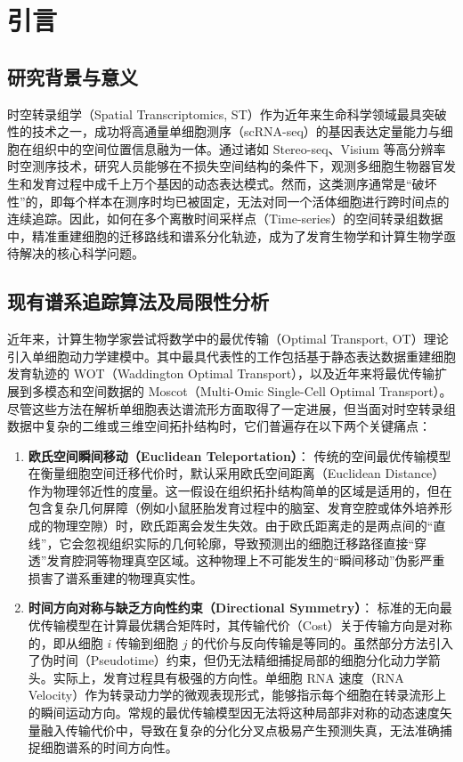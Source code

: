 
\chapter{引言}
\label{ch:intro}

\section{研究背景与意义}
时空转录组学（Spatial Transcriptomics, ST）作为近年来生命科学领域最具突破性的技术之一，成功将高通量单细胞测序（scRNA-seq）的基因表达定量能力与细胞在组织中的空间位置信息融为一体\cite{Asp2020}。通过诸如 Stereo-seq、Visium 等高分辨率时空测序技术，研究人员能够在不损失空间结构的条件下，观测多细胞生物器官发生和发育过程中成千上万个基因的动态表达模式\cite{Chen2022}。然而，这类测序通常是“破坏性”的，即每个样本在测序时均已被固定，无法对同一个活体细胞进行跨时间点的连续追踪。因此，如何在多个离散时间采样点（Time-series）的空间转录组数据中，精准重建细胞的迁移路线和谱系分化轨迹，成为了发育生物学和计算生物学亟待解决的核心科学问题。

\section{现有谱系追踪算法及局限性分析}
近年来，计算生物学家尝试将数学中的最优传输（Optimal Transport, OT）理论引入单细胞动力学建模中\cite{Villani2009}。其中最具代表性的工作包括基于静态表达数据重建细胞发育轨迹的 WOT（Waddington Optimal Transport）\cite{Schiebinger2019}，以及近年来将最优传输扩展到多模态和空间数据的 Moscot（Multi-Omic Single-Cell Optimal Transport）\cite{Klein2024}。尽管这些方法在解析单细胞表达谱流形方面取得了一定进展，但当面对时空转录组数据中复杂的二维或三维空间拓扑结构时，它们普遍存在以下两个关键痛点：

\begin{enumerate}
    \item \textbf{欧氏空间瞬间移动（Euclidean Teleportation）}：
    传统的空间最优传输模型在衡量细胞空间迁移代价时，默认采用欧氏空间距离（Euclidean Distance）作为物理邻近性的度量。这一假设在组织拓扑结构简单的区域是适用的，但在包含复杂几何屏障（例如小鼠胚胎发育过程中的脑室、发育空腔或体外培养形成的物理空隙）时，欧氏距离会发生失效。由于欧氏距离走的是两点间的“直线”，它会忽视组织实际的几何轮廓，导致预测出的细胞迁移路径直接“穿透”发育腔洞等物理真空区域。这种物理上不可能发生的“瞬间移动”伪影严重损害了谱系重建的物理真实性。
    
    \item \textbf{时间方向对称与缺乏方向性约束（Directional Symmetry）}：
    标准的无向最优传输模型在计算最优耦合矩阵时，其传输代价（Cost）关于传输方向是对称的，即从细胞 $i$ 传输到细胞 $j$ 的代价与反向传输是等同的。虽然部分方法引入了伪时间（Pseudotime）约束，但仍无法精细捕捉局部的细胞分化动力学箭头。实际上，发育过程具有极强的方向性。单细胞 RNA 速度（RNA Velocity）作为转录动力学的微观表现形式，能够指示每个细胞在转录流形上的瞬间运动方向\cite{LaManno2018, Bergen2020}。常规的最优传输模型因无法将这种局部非对称的动态速度矢量融入传输代价中，导致在复杂的分化分叉点极易产生预测失真，无法准确捕捉细胞谱系的时间方向性。
\end{enumerate}

